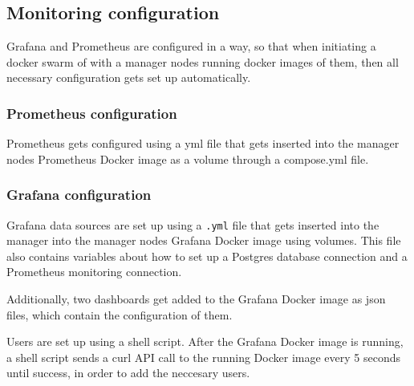 \subsection{Monitoring configuration}

Grafana and Prometheus are configured in a way, so that when initiating a docker swarm of with a manager nodes running docker images of them, then all necessary configuration gets set up automatically.

\subsubsection{Prometheus configuration}

Prometheus gets configured using a yml file that gets inserted into the manager nodes Prometheus Docker image as a volume through a compose.yml file.

\subsubsection{Grafana configuration}

Grafana data sources are set up using a \texttt{.yml} file that gets inserted into the manager into the manager nodes Grafana Docker image using volumes. This file also
contains variables about how to set up a Postgres database connection and a Prometheus monitoring connection.

Additionally, two dashboards get added to the Grafana Docker image as json files, which contain the configuration of them.

Users are set up using a shell script.
After the Grafana Docker image is running, a shell script sends a curl API call to the running Docker image every 5 seconds until success, in order to add the neccesary users.
